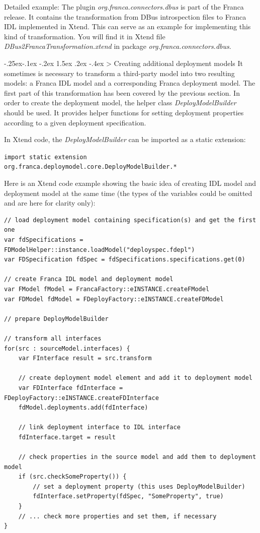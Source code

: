 \documentclass[a4paper,10pt]{scrreprt}
\makeatletter
\renewcommand\subsection{\medskip\@startsection{subsection}{2}{\z@}%
  {-.25ex\@plus -.1ex \@minus -.2ex}%
  {1.5ex \@plus .2ex \@minus -.4ex}%
  {\ifnum \scr@compatibility>\@nameuse{scr@v@2.96}\relax
    \setlength{\parfillskip}{\z@ plus 1fil}\fi
    \raggedsection\normalfont\sectfont\nobreak\size@subsection
  }%
}
\makeatother
\begin{document}
Detailed example: The plugin \textit{org.franca.connectors.dbus} is part of the Franca release. It contains
the transformation from DBus introspection files to Franca IDL implemented in Xtend.
This can serve as an example for implementing this kind of transformation.
You will find it in Xtend file \textit{DBus2FrancaTransformation.xtend} in package
\textit{org.franca.connectors.dbus}.

\subsection{Creating additional deployment models}
\label{BuildingTransformations_XToFranca_WithDeployment}
It sometimes is necessary to transform a third-party model into two resulting models:
a Franca IDL model and a corresponding Franca deployment model. The first part of this
transformation has been covered by the previous section. In order to create the deployment
model, the helper class \textit{DeployModelBuilder} should be used. It provides helper functions
for setting deployment properties according to a given deployment specification.

In Xtend code, the \textit{DeployModelBuilder} can be imported as a static extension:

\protect\lstinline[language=Xtend]{import static extension org.franca.deploymodel.core.DeployModelBuilder.*}
 
Here is an Xtend code example showing the basic idea of creating IDL model and
deployment model at the same time (the types of the variables could be omitted
and are here for clarity only):


\begin{lstlisting}[language=Xtend]
// load deployment model containing specification(s) and get the first one
var fdSpecifications = FDModelHelper::instance.loadModel("deployspec.fdepl")
var FDSpecification fdSpec = fdSpecifications.specifications.get(0)

// create Franca IDL model and deployment model
var FModel fModel = FrancaFactory::eINSTANCE.createFModel
var FDModel fdModel = FDeployFactory::eINSTANCE.createFDModel

// prepare DeployModelBuilder

// transform all interfaces
for(src : sourceModel.interfaces) {
	var FInterface result = src.transform
	
	// create deployment model element and add it to deployment model
	var FDInterface fdInterface = FDeployFactory::eINSTANCE.createFDInterface
	fdModel.deployments.add(fdInterface)
	
	// link deployment interface to IDL interface
	fdInterface.target = result
	
	// check properties in the source model and add them to deployment model
	if (src.checkSomeProperty()) {
		// set a deployment property (this uses DeployModelBuilder)
		fdInterface.setProperty(fdSpec, "SomeProperty", true)
	}	
	// ... check more properties and set them, if necessary 
}
\end{lstlisting}
\end{document}
